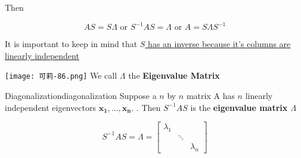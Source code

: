 Then

\begin{equation}
    AS = S\Lambda \text{\ \ \ \ \ \ or \ \ \ \ \ \ } S^{-1}AS = \Lambda \text{\ \ \ \ \ \ or \ \ \ \ \ \ } A = S\Lambda S^{-1}
\end{equation}

It is important to keep in mind that
\href{https://en.wikipedia.org/wiki/Invertible_matrix#The_invertible_matrix_theorem}{$S$ has an inverse because it's columns are linearly independent}

\texttt{[image: 可莉-86.png]} We call $\Lambda$ the \textbf{Eigenvalue Matrix}

\begin{Definition}{Diagonalization}{diagonalization}
    Suppose a $n$ by $n$ matrix A has $n$ linearly independent eigenvectors
    $\boldsymbol{x_1}, \ldots, \boldsymbol{x_n}$. . Then
    $S^{-1}AS$ is the \textbf{eigenvalue matrix $\Lambda$}

    \begin{equation}
        S^{-1}AS = \Lambda = \begin{bmatrix}
                                \lambda_1 &      & \\
                                &         \ddots & \\
                                &         &      \lambda_n
        \end{bmatrix}
    \end{equation}
\end{Definition}

